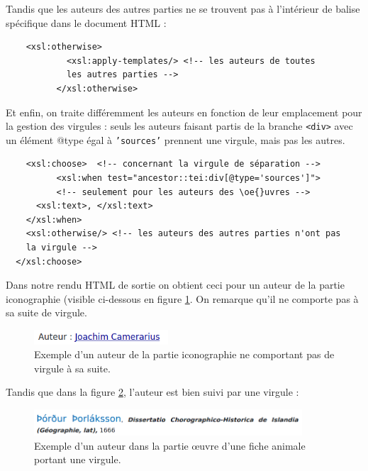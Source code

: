 \documentclass[a4paper,12pt,twoside]{book}
\begin{document}
    Tandis que les auteurs des autres parties ne se trouvent pas à l'intérieur de balise spécifique dans le document HTML :
    
    \begin{verbatim}
    <xsl:otherwise>
            <xsl:apply-templates/> <!-- les auteurs de toutes 
            les autres parties -->
          </xsl:otherwise>
    \end{verbatim}
    
    Et enfin, on traite différemment les auteurs en fonction de leur emplacement pour la gestion des virgules : seuls les auteurs faisant partis de la branche \texttt{<div>} avec un élément @type égal à \texttt{'sources'} prennent une virgule, mais pas les autres.
    
    \begin{verbatim}
    <xsl:choose>  <!-- concernant la virgule de séparation -->
          <xsl:when test="ancestor::tei:div[@type='sources']">
          <!-- seulement pour les auteurs des \oe{}uvres -->
      <xsl:text>, </xsl:text>
    </xsl:when>
    <xsl:otherwise/> <!-- les auteurs des autres parties n'ont pas
    la virgule -->
  </xsl:choose>
    \end{verbatim}
    
    Dans notre rendu HTML de sortie on obtient ceci pour un auteur de la partie iconographie (visible ci-dessous en figure \ref{aut}. On remarque qu'il ne comporte pas à sa suite de virgule.
    
   \begin{figure}[H]
       \centering
       \includegraphics[width=5cm]{img/autre/auteur_icono.png}
       \caption{Exemple d'un auteur de la partie iconographie ne comportant pas de virgule à sa suite.}
       \label{aut}
   \end{figure}

    Tandis que dans la figure \ref{auteurvir}, l'auteur est bien suivi par une virgule :
    
    \begin{figure}[H]
        \centering
        \includegraphics[width=10cm]{img/autre/auteur_virgule.png}
        \caption{Exemple d'un auteur dans la partie \oe{}uvre d'une fiche animale portant une virgule.}
        \label{auteurvir}
    \end{figure}
    
\end{document}

